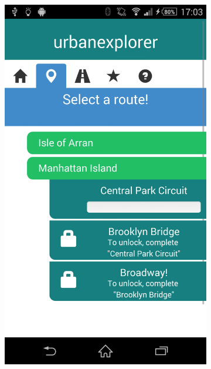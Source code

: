 \begin{figure}[h]
  \centering
  \begin{subfigure}[b]{0.3\textwidth}
    \includegraphics[width=\textwidth]{images/screens/targets.png}
  \end{subfigure}
  \hspace{0.02\textwidth}
  \begin{subfigure}[b]{0.3\textwidth}

\end{subfigure}
\end{figure}
